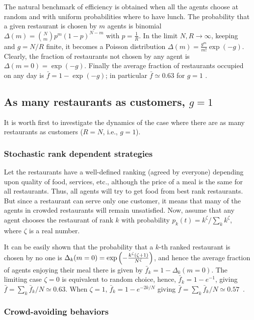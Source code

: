\documentclass[aps,twocolumn,nofootinbib,sortedaddress,reprint]{revtex4-1}
\begin{document}
The natural benchmark of efficiency is obtained when all the agents choose at random and with uniform probabilities where to have lunch. The probability that a given restaurant is chosen
by $m$ agents is  binomial $\Delta(m) = \binom{N}{m} p^m
(1-p)^{N-m}$ with $p=\frac{1}{R}$.  In the limit $N,
R\rightarrow\infty$, keeping and $g=N/R$ finite, it becomes a Poisson
distribution $\Delta(m) = \frac{g^m}{m!} \exp({-g})$.  Clearly,
the fraction of restaurants not chosen by any agent is $\Delta(m=0) =
\exp(-g)$. Finally the average fraction of restaurants
occupied on any day is $\bar{f}= 1- \exp(- g)$; in particular $\bar{f} \simeq
0.63$ for $g=1$ \cite{kpr-physica}.

\subsection{As many restaurants as customers, $g=1$}


It is worth first to investigate the dynamics of the case where there are as many restaurants as customers ($R=N$, i.e., $g=1$).


\subsubsection{Stochastic rank dependent strategies}
Let the restaurants have a well-defined ranking (agreed by everyone)
depending upon quality of food, services, etc.,  although the price of a
meal is the same for all restaurants.  Thus, all agents will try to get
food from best rank restaurants.  But since a restaurant can serve
only one customer, it means that many of the agents in crowded
restaurants will remain unsatisfied.  Now, assume that any agent
chooses the restaurant of rank $k$ with probability $p_k(t)=k^\zeta/\sum_k
k^\zeta$, where $\zeta$ is a real number.


It can be easily shown that the probability that a $k$-th ranked
restaurant is chosen by no one is $ \Delta_k(m=0)=\exp\left(-{k^\zeta
  \left(\zeta+1\right)\over N^\zeta}\right)$, and hence the average
fraction of agents enjoying their meal there is given by $\bar f_k=1-
\Delta_k\left(m=0\right)$.  The limiting case $\zeta=0$ is equivalent
to random choice, hence, $\bar f_k=1-e^{-1}$, giving $\bar f=\sum_k \bar f_k/N
\simeq 0.63$. When $\zeta=1$, $\bar f_k=1-e^{-2k/N}$ giving $\bar
f=\sum_k \bar f_k/N \simeq 0.57$~\cite{kpr-njp}.

\subsubsection{Crowd-avoiding behaviors}
\end{document}
